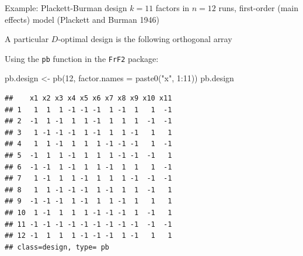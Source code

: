 \documentclass[
  ignorenonframetext,
]{beamer}
\newenvironment{Shaded}{\begin{snugshade}}{\end{snugshade}}
\newcommand{\AttributeTok}[1]{\textcolor[rgb]{0.77,0.63,0.00}{#1}}
\newcommand{\DecValTok}[1]{\textcolor[rgb]{0.00,0.00,0.81}{#1}}
\newcommand{\FunctionTok}[1]{\textcolor[rgb]{0.00,0.00,0.00}{#1}}
\newcommand{\NormalTok}[1]{#1}
\newcommand{\OtherTok}[1]{\textcolor[rgb]{0.56,0.35,0.01}{#1}}
\newcommand{\SpecialCharTok}[1]{\textcolor[rgb]{0.00,0.00,0.00}{#1}}
\newcommand{\StringTok}[1]{\textcolor[rgb]{0.31,0.60,0.02}{#1}}
\begin{document}
\begin{frame}[fragile]{Example: Plackett-Burman design}
\protect\hypertarget{example-plackett-burman-design}{}
\(k=11\) factors in \(n=12\) runs, first-order (main effects) model
(Plackett and Burman 1946)

A particular \(D\)-optimal design is the following orthogonal array

Using the \texttt{pb} function in the \texttt{FrF2} package:

\begin{Shaded}
\begin{Highlighting}[]
\NormalTok{pb.design }\OtherTok{\textless{}{-}} \FunctionTok{pb}\NormalTok{(}\DecValTok{12}\NormalTok{, }\AttributeTok{factor.names =} \FunctionTok{paste0}\NormalTok{(}\StringTok{"x"}\NormalTok{, }\DecValTok{1}\SpecialCharTok{:}\DecValTok{11}\NormalTok{))}
\NormalTok{pb.design}
\end{Highlighting}
\end{Shaded}

\begin{verbatim}
##    x1 x2 x3 x4 x5 x6 x7 x8 x9 x10 x11
## 1   1  1  1 -1 -1 -1  1 -1  1   1  -1
## 2  -1  1 -1  1  1 -1  1  1  1  -1  -1
## 3   1 -1 -1 -1  1 -1  1  1 -1   1   1
## 4   1  1 -1  1  1  1 -1 -1 -1   1  -1
## 5  -1  1  1 -1  1  1  1 -1 -1  -1   1
## 6  -1 -1  1 -1  1  1 -1  1  1   1  -1
## 7   1 -1  1  1 -1  1  1  1 -1  -1  -1
## 8   1  1 -1 -1 -1  1 -1  1  1  -1   1
## 9  -1 -1 -1  1 -1  1  1 -1  1   1   1
## 10  1 -1  1  1  1 -1 -1 -1  1  -1   1
## 11 -1 -1 -1 -1 -1 -1 -1 -1 -1  -1  -1
## 12 -1  1  1  1 -1 -1 -1  1 -1   1   1
## class=design, type= pb
\end{verbatim}
\end{frame}
\end{document}
